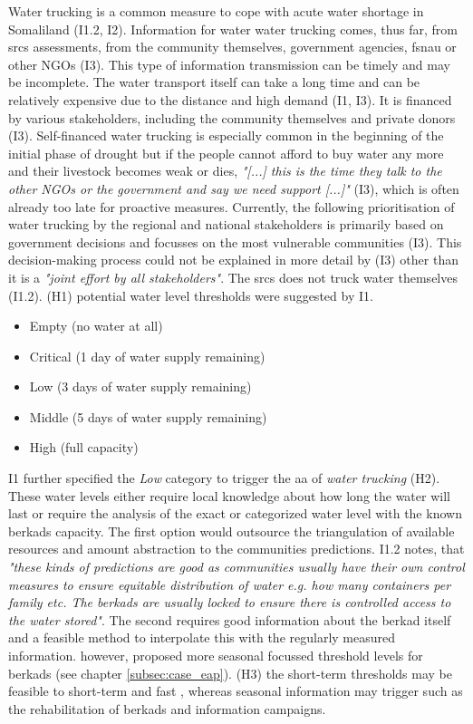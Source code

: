 Water trucking is a common measure to cope with acute water shortage in Somaliland (I1.2, I2). Information for water water trucking comes, thus far, from \acrshort{srcs} assessments, from the community themselves, government agencies, \acrshort{fsnau} or other NGOs (I3). This type of information transmission can be timely and may be incomplete. The water transport itself can take a long time and can be relatively expensive due to the distance and high demand (I1, I3). It is financed by various stakeholders, including the community themselves and private donors (I3). Self-financed water trucking is especially common in the beginning of the initial phase of drought but if the people cannot afford to buy water any more and their livestock becomes weak or dies, \textit{"[...] this is the time they talk to the other NGOs or the government and say we need support [...]"} (I3), which is often already too late for proactive measures. Currently, the following prioritisation of water trucking by the regional and national stakeholders is primarily based on government decisions and focusses on the most vulnerable communities (I3). This decision-making process could not be explained in more detail by (I3) other than it is a \textit{"joint effort by all stakeholders"}. The \acrshort{srcs} does not truck water themselves (I1.2).\newline
(H1) potential water level thresholds were suggested by I1.
\begin{itemize}
    \item Empty (no water at all)
    \item Critical (1 day of water supply remaining)
    \item Low (3 days of water supply remaining)
    \item Middle (5 days of water supply remaining)
    \item High (full capacity)
\end{itemize}
I1 further specified the \textit{Low} category to trigger the \acrshort{aa} of \textit{water trucking} (H2). These water levels either require local knowledge about how long the water will last or require the analysis of the exact or categorized water level with the known berkads capacity. The first option would outsource the triangulation of available resources and amount abstraction to the communities predictions. I1.2 notes, that \textit{"these kinds of predictions are good as communities usually have their own control measures to ensure equitable distribution of water e.g. how many containers per family etc. The berkads are usually locked to ensure there is controlled access to the water stored"}. The second requires good information about the berkad itself and a feasible method to interpolate this with the regularly measured information. \Textcite{gualazziniEWEAEarlyWarning2021} however, proposed more seasonal focussed threshold levels for berkads (see chapter \ref{subsec:case_eap}). (H3) the short-term thresholds may be feasible to short-term and fast , whereas seasonal information may trigger  such as the rehabilitation of berkads and information campaigns.

